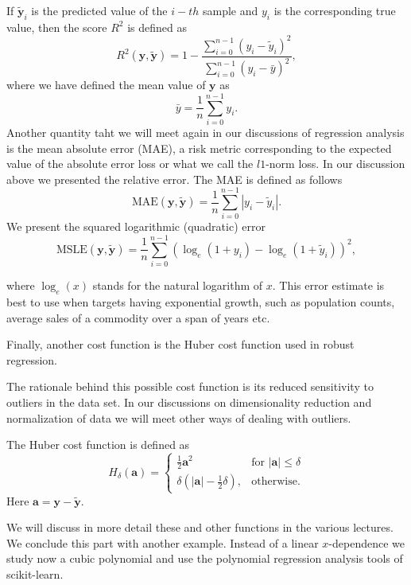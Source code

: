 \documentclass{beamer}
\begin{document}
\begin{frame}
If $\tilde{\bm{y}}_i$ is the predicted value of the $i-th$ sample and $y_i$ is the corresponding true value, then the score $R^2$ is defined as
\[
R^2(\bm{y}, \tilde{\bm{y}}) = 1 - \frac{\sum_{i=0}^{n - 1} (y_i - \tilde{y}_i)^2}{\sum_{i=0}^{n - 1} (y_i - \bar{y})^2},
\]
where we have defined the mean value  of $\bm{y}$ as
\[
\bar{y} =  \frac{1}{n} \sum_{i=0}^{n - 1} y_i.
\]
Another quantity taht we will meet again in our discussions of regression analysis is 
 the mean absolute error (MAE), a risk metric corresponding to the expected value of the absolute error loss or what we call the $l1$-norm loss. In our discussion above we presented the relative error.
The MAE is defined as follows
\[
\text{MAE}(\bm{y}, \bm{\tilde{y}}) = \frac{1}{n} \sum_{i=0}^{n-1} \left| y_i - \tilde{y}_i \right|.
\]
We present the 
squared logarithmic (quadratic) error
\[
\text{MSLE}(\bm{y}, \bm{\tilde{y}}) = \frac{1}{n} \sum_{i=0}^{n - 1} (\log_e (1 + y_i) - \log_e (1 + \tilde{y}_i) )^2,
\]

where $\log_e (x)$ stands for the natural logarithm of $x$. This error
estimate is best to use when targets having exponential growth, such
as population counts, average sales of a commodity over a span of
years etc. 

Finally, another cost function is the Huber cost function used in robust regression.

The rationale behind this possible cost function is its reduced
sensitivity to outliers in the data set. In our discussions on
dimensionality reduction and normalization of data we will meet other
ways of dealing with outliers.

The Huber cost function is defined as
\[
H_{\delta}(\bm{a})=\left\{\begin{array}{cc}\frac{1}{2} \bm{a}^{2}& \text{for }|\bm{a}|\leq \delta\\ \delta (|\bm{a}|-\frac{1}{2}\delta ),&\text{otherwise}.\end{array}\right.
\]
Here $\bm{a}=\bm{y} - \bm{\tilde{y}}$.

We will discuss in more detail these and other functions in the
various lectures.  We conclude this part with another example. Instead
of a linear $x$-dependence we study now a cubic polynomial and use the
polynomial regression analysis tools of scikit-learn.

































\end{frame}
\end{document}

